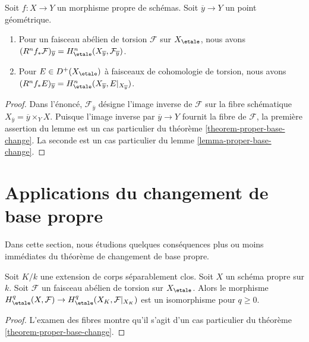 \begin{lemma}
\label{lemma-proper-base-change-stalk}
Soit $f : X \to Y$ un morphisme propre de schémas. Soit $\overline{y} \to Y$
un point géométrique.
\begin{enumerate}
\item Pour un faisceau abélien de torsion $\mathcal{F}$ sur $X_\etale$, nous avons
$(R^nf_*\mathcal{F})_{\overline{y}} =
H^n_\etale(X_{\overline{y}}, \mathcal{F}_{\overline{y}})$.
\item Pour $E \in D^+(X_\etale)$ à faisceaux de cohomologie de torsion, nous avons
$(R^nf_*E)_{\overline{y}} =
H^n_\etale(X_{\overline{y}}, E|_{X_{\overline{y}}})$.
\end{enumerate}
\end{lemma}

\begin{proof}
Dans l'énoncé, $\mathcal{F}_{\overline{y}}$ désigne l'image inverse
de $\mathcal{F}$ sur la fibre schématique
$X_{\overline{y}} = \overline{y} \times_Y X$.
Puisque l'image inverse par $\overline{y} \to Y$ fournit la
fibre de $\mathcal{F}$, la première assertion du lemme
est un cas particulier du théorème \ref{theorem-proper-base-change}.
La seconde est un cas particulier du lemme \ref{lemma-proper-base-change}.
\end{proof}






\section{Applications du changement de base propre}
\label{section-applications-proper-base-change}

\noindent
Dans cette section, nous étudions quelques conséquences plus ou moins immédiates
du théorème de changement de base propre.

\begin{lemma}
\label{lemma-base-change-separably-closed}
Soit $K/k$ une extension de corps séparablement clos.
Soit $X$ un schéma propre sur $k$.
Soit $\mathcal{F}$ un faisceau abélien de torsion sur $X_\etale$.
Alors le morphisme $H^q_\etale(X, \mathcal{F}) \to
H^q_\etale(X_K, \mathcal{F}|_{X_K})$ est un isomorphisme
pour $q \geq 0$.
\end{lemma}

\begin{proof}
L'examen des fibres montre qu'il s'agit
d'un cas particulier du
théorème \ref{theorem-proper-base-change}.
\end{proof}

